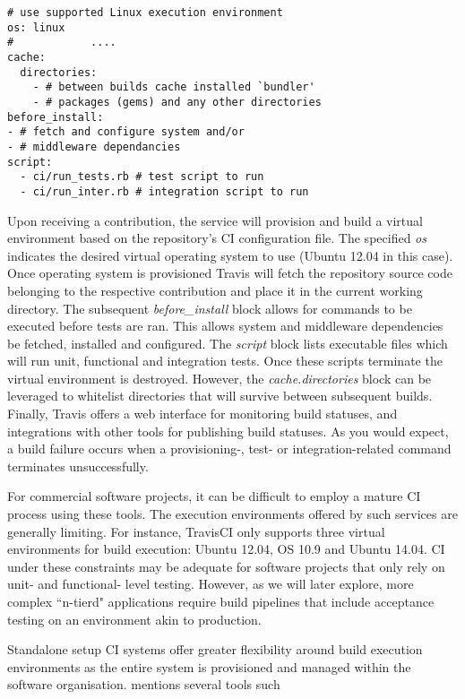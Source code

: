 \documentclass{report}
\begin{document}
\begin{verbatim}
# use supported Linux execution environment
os: linux 
#		     ....
cache:
  directories:
    - # between builds cache installed `bundler' 
    - # packages (gems) and any other directories
before_install:
- # fetch and configure system and/or
- # middleware dependancies
script: 
  - ci/run_tests.rb # test script to run
  - ci/run_inter.rb # integration script to run
  \end{verbatim}
\par
Upon receiving a contribution, the service will provision
and build a virtual environment based on the repository's CI configuration
file. The specified \textit{os} indicates the desired virtual operating system 
to use (Ubuntu 12.04 in this case). Once operating system is provisioned
Travis will fetch the repository source code belonging to the respective contribution
and place it in the current working directory. The subsequent \textit{before\_install}
block allows for commands to be executed before tests are ran. This allows system
 and middleware dependencies be fetched, installed and configured. The \textit{script} block
 lists executable files which will run unit, functional and integration tests. Once
 these scripts terminate the virtual environment is destroyed. However, 
 the \textit{cache.directories} block can be leveraged to whitelist directories 
 that will survive between subsequent builds. Finally, Travis offers a web interface for monitoring build statuses, and 
integrations with other tools for publishing build statuses. As you would expect,
a build failure occurs when a provisioning-, test- or integration-related command
terminates unsuccessfully. 
\par
For commercial software projects, it can be difficult to employ a mature CI process using these tools.
The execution environments offered by such services are generally limiting. 
For instance, TravisCI only supports three virtual environments for build execution: Ubuntu 12.04,
OS 10.9 and Ubuntu 14.04. CI under these constraints may be
adequate for software projects that only rely on unit- and functional- level
testing. However, as we will later explore, more complex ``n-tierd" applications require build pipelines that 
include acceptance testing on an environment akin to production. 
\par
Standalone setup CI systems offer greater flexibility around build 
execution environments as the entire system
is provisioned and managed within the software organisation. 
\citet{Duvall} mentions several tools such
\end{document}
